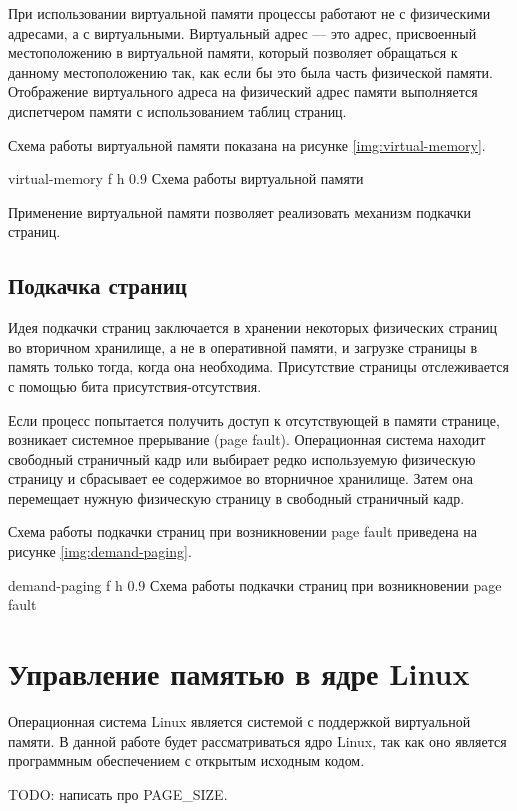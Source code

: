 При использовании виртуальной памяти процессы работают не с физическими адресами, а с виртуальными. Виртуальный адрес --- это адрес, присвоенный местоположению в виртуальной памяти, который позволяет обращаться к данному местоположению так, как если бы это была часть физической памяти. Отображение виртуального адреса на физический адрес памяти выполняется диспетчером памяти с использованием таблиц страниц.

Схема работы виртуальной памяти показана на рисунке \ref{img:virtual-memory}.

    {virtual-memory}
    {f}
    {h}
    {0.9\textwidth}
    {Схема работы виртуальной памяти}

Применение виртуальной памяти позволяет реализовать механизм подкачки страниц.

\subsection{Подкачка страниц}

Идея подкачки страниц заключается в хранении некоторых физических страниц во вторичном хранилище, а не в оперативной памяти, и загрузке страницы в память только тогда, когда она необходима. Присутствие страницы отслеживается с помощью бита присутствия-отсутствия.

Если процесс попытается получить доступ к отсутствующей в памяти странице, возникает системное прерывание (page fault). Операционная система находит свободный страничный кадр или выбирает редко используемую физическую страницу и сбрасывает ее содержимое во вторничное хранилище. Затем она перемещает нужную физическую страницу в свободный страничный кадр.

Схема работы подкачки страниц при возникновении page fault приведена на рисунке \ref{img:demand-paging}.

    {demand-paging}
    {f}
    {h}
    {0.9\textwidth}
    {Схема работы подкачки страниц при возникновении page fault}

\section{Управление памятью в ядре Linux}

Операционная система Linux является системой с поддержкой виртуальной памяти. В данной работе будет рассматриваться ядро Linux, так как оно является программным обеспечением с открытым исходным кодом.

TODO: написать про PAGE\_SIZE.


